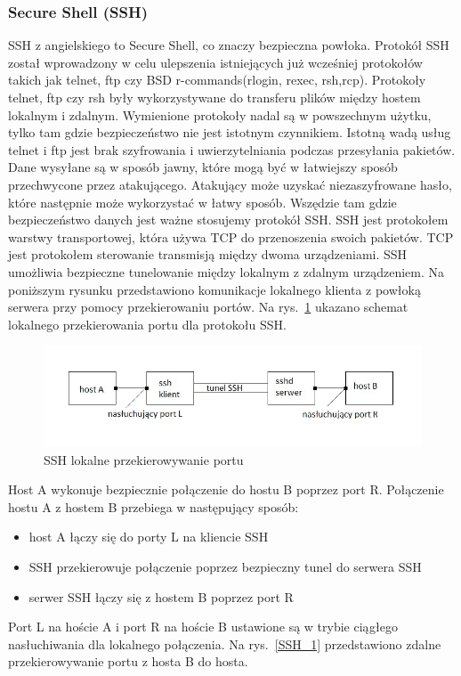 \documentclass[12p]{article}
\begin{document}
\subsubsection{Secure Shell (SSH)}
\quad SSH z angielskiego to Secure Shell, co znaczy bezpieczna powłoka. Protokół SSH został wprowadzony w celu ulepszenia istniejących już wcześniej protokołów takich jak telnet, ftp czy BSD r-commands(rlogin, rexec, rsh,rcp). Protokoły telnet, ftp czy rsh były wykorzystywane do transferu plików między hostem lokalnym i zdalnym. Wymienione protokoły nadal są w powszechnym użytku, tylko tam gdzie bezpieczeństwo nie jest istotnym czynnikiem. Istotną wadą usług telnet i ftp jest brak szyfrowania i uwierzytelniania podczas przesyłania pakietów. Dane wysyłane są w sposób jawny, które mogą być w łatwiejszy sposób przechwycone przez atakującego. Atakujący może uzyskać niezaszyfrowane hasło, które następnie może wykorzystać w łatwy sposób. Wszędzie tam gdzie bezpieczeństwo danych jest ważne stosujemy protokół SSH. 
\quad SSH jest protokołem warstwy transportowej, która używa TCP do przenoszenia swoich pakietów. TCP jest protokołem sterowanie transmisją między dwoma urządzeniami. SSH umożliwia bezpieczne tunelowanie między lokalnym z zdalnym urządzeniem. Na poniższym rysunku przedstawiono komunikacje lokalnego klienta z powłoką serwera przy pomocy przekierowaniu portów. Na rys.~\ref{SSH} ukazano schemat lokalnego przekierowania portu dla protokołu SSH.
\begin{figure}[H]
\centering
\includegraphics[width=12cm]{przekierowywanie_lokalne_SSH.jpg}
\caption{SSH lokalne przekierowywanie portu}\label{SSH}
\end{figure}

Host A wykonuje bezpiecznie połączenie do hostu B poprzez port R. Połączenie hostu A z hostem B przebiega w następujący sposób:
\begin{itemize}
\item host A łączy się do porty L na kliencie SSH
\item SSH przekierowuje połączenie poprzez bezpieczny tunel do serwera SSH
\item serwer SSH łączy się z hostem B poprzez port R
\end{itemize}
\newpage Port L na hoście A i port R na hoście B ustawione są w trybie ciągłego nasłuchiwania dla lokalnego połączenia. Na rys.~\ref{SSH_1} przedstawiono zdalne przekierowywanie portu z hosta B do hosta.
 
\end{document}
